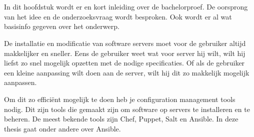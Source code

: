
\chapter{}
\label{ch:inleiding}
In dit hoofdstuk wordt er en kort inleiding over de bachelorproef. De oorsprong van het idee en de onderzoeksvraag wordt besproken. Ook wordt er al wat basisinfo gegeven over het onderwerp.


De installatie en modificatie van software servers moet voor de gebruiker altijd makkelijker en sneller. Eens de gebruiker weet wat voor server hij wilt, wilt hij liefst zo snel mogelijk opzetten met de nodige specificaties. Of als de gebruiker een kleine aanpassing wilt doen aan de server, wilt hij dit zo makkelijk mogelijk aanpassen. 

Om dit zo efficiënt mogelijk te doen heb je configuration management tools nodig. Dit zijn tools die gemaakt zijn om software op servers te installeren en te beheren. De meest bekende tools zijn Chef, Puppet, Salt en Ansible. In deze thesis gaat onder andere over Ansible. 



\section{}
\label{sec:context}

